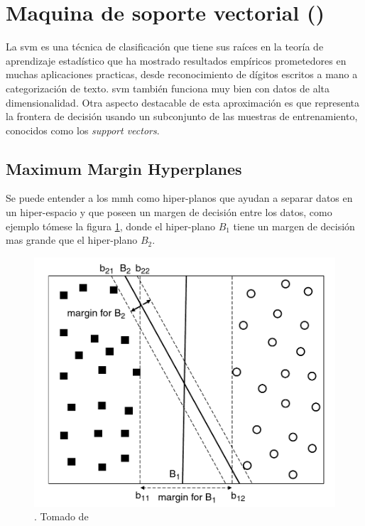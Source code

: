 
\section{Maquina de soporte vectorial ()} \label{sec:SVM}
La \gls{svm} es una técnica de clasificación que tiene sus raíces en la teoría de aprendizaje estadístico que ha mostrado resultados empíricos prometedores en muchas aplicaciones practicas, desde reconocimiento de dígitos escritos a mano a categorización de texto. \gls{svm} también funciona muy bien con datos de alta dimensionalidad. Otra aspecto destacable de esta aproximación es que representa la frontera de decisión usando un subconjunto de las muestras de entrenamiento, conocidos como los \emph{support vectors}.

\subsection{Maximum Margin Hyperplanes}
Se puede entender a los \gls{mmh} como hiper-planos que ayudan a separar datos en un hiper-espacio y que poseen un margen de decisión entre los datos, como ejemplo tómese la figura \ref{fig:svm-hyperplanes}, donde el hiper-plano $B_1$ tiene un margen de decisión mas grande que el hiper-plano $B_2$.

\begin{figure}[th]
\centering
\includegraphics[scale=0.3]{Figures/svm-hyperplanes.png}
\decoRule
\caption[]{. Tomado de \cite{tan2005introduction}}
\label{fig:svm-hyperplanes}
\end{figure}

